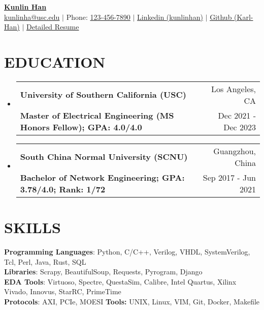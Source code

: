 \documentclass[letterpaper,11pt]{article}
\makeatletter
\newcommand{\resumeSubheading}[4]{
  \vspace{-1pt}\item
    \begin{tabular*}{0.97\textwidth}[t]{l@{\extracolsep{\fill}}r}
      \textbf{#1} & #2 \\
      \textbf{\small#3} & \small{#4} \\
    \end{tabular*}\vspace{-10pt}
}
\newcommand{\resumeSubHeadingListStart}{\begin{itemize}[leftmargin=*]}
\newcommand{\resumeSubHeadingListEnd}{\end{itemize}\vspace{-5pt}}
\makeatother
\begin{document}
\textbf{\href{https://www.linkedin.com/in/kunlinhan/}{\LARGE {Kunlin Han}}} \\
{
    \href{mailto:{kunlinha@usc.edu}}{{kunlinha@usc.edu}} $|$ Phone: \href{tel:{}}{123-456-7890} $|$ \href{https://www.linkedin.com/in/kunlinhan/}{Linkedin (kunlinhan)}  $|$ \href{https://github.com/Karl-Han}{Github (Karl-Han)}  $|$ \href{https://www.iwktd.com/}{Detailed Resume} 
}\section{EDUCATION}
\resumeSubHeadingListStart
\resumeSubheading
    {University of Southern California (USC)}{Los Angeles, CA}
    {Master of Electrical Engineering (MS Honors Fellow); GPA: 4.0/4.0
}{Dec 2021 - Dec 2023}
\resumeSubheading
    {South China Normal University (SCNU)}{Guangzhou, China}
    {Bachelor of Network Engineering; GPA: 3.78/4.0; Rank: 1/72
}{Sep 2017 - Jun 2021}
\resumeSubHeadingListEnd



\section{SKILLS}
\textbf{Programming Languages}: Python, C/C++, Verilog, VHDL, SystemVerilog, Tcl, Perl, Java, Rust, SQL\\ 
\textbf{Libraries}: Scrapy, BeautifulSoup, Requests, Pyrogram, Django\\ 
\textbf{EDA Tools}: Virtuoso, Spectre, QuestaSim, Calibre, Intel Quartus, Xilinx Vivado, Innovus, StarRC, PrimeTime\\ 
\textbf{Protocols}: AXI, PCIe, MOESI \hspace{\fill} \textbf{Tools:} UNIX, Linux, VIM, Git, Docker, Makefile\\ 
\end{document}
